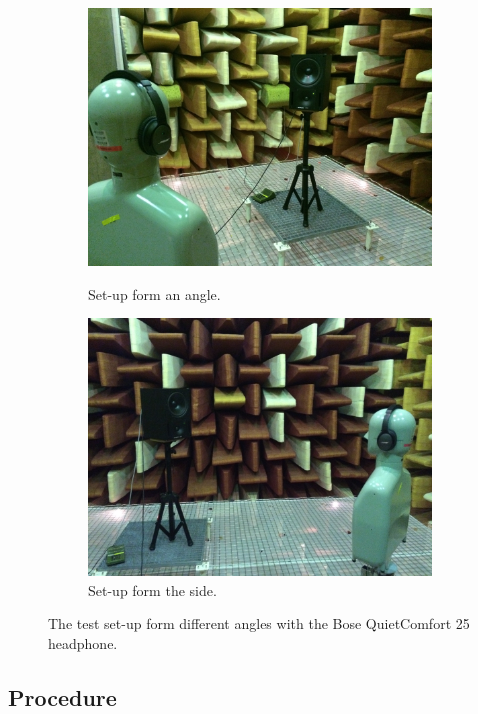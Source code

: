 \begin{figure}[H]
\begin{subfigure}[b]{0.4\textwidth}
		\includegraphics[width=\textwidth]{../Journal/Experiments/TestofConsumerHeadphones/Pictures/OtherBrandsSetupAngle.jpg}
		\caption{Set-up form an angle.}
		\vspace{2ex}
		\includegraphics[width=\textwidth]{../Journal/Experiments/TestofConsumerHeadphones/Pictures/OtherBrandsSetupSide.jpg}
		\caption{Set-up form the side.}
	\end{subfigure}
	\caption{The test set-up form different angles with the Bose QuietComfort 25 headphone.}
\label{fig:OtherBrandsPicture}
\end{figure}


\subsection{Procedure}
